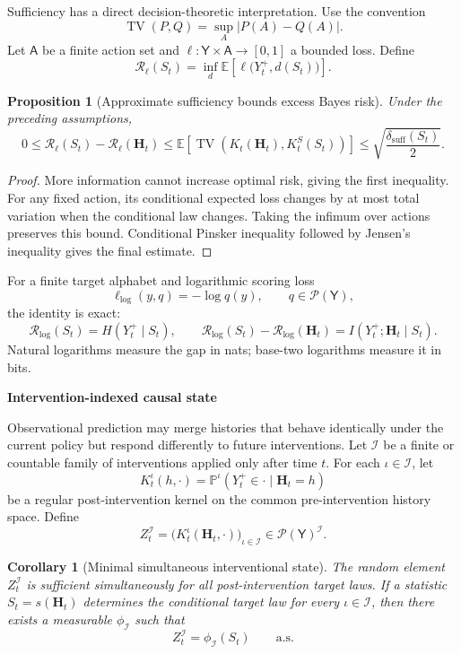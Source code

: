 \documentclass[11pt,letterpaper]{article}
\newcommand{\Risk}{\mathcal R}
\DeclareMathOperator{\TV}{TV}
\newcommand{\subtopic}[1]{%
 \vspace{0.45em}
 {\bfseries\color{AccentColor} #1\par}
}
\theoremstyle{plain}
\newtheorem{proposition}[theorem]{Proposition}
\newtheorem{corollary}[theorem]{Corollary}
\theoremstyle{definition}
\begin{document}
Sufficiency has a direct decision-theoretic interpretation. Use the
convention
\[
\TV(P,Q)=\sup_{A}|P(A)-Q(A)|.
\]
Let \(\mathsf A\) be a finite action set and
\(\ell:\mathsf Y\times\mathsf A\to[0,1]\) a bounded loss. Define
\[
\Risk_\ell(S_t)
=
\inf_{d}
\mathbb E\!\left[
\ell\bigl(Y_t^+,d(S_t)\bigr)
\right].
\]

\begin{proposition}[Approximate sufficiency bounds excess Bayes risk]
\label{prop:risk-pinsker}
Under the preceding assumptions,
\[
\boxed{
0
\leq
\Risk_\ell(S_t)-\Risk_\ell(\mathbf H_t)
\leq
\mathbb E\!\left[
\TV\!\left(K_t(\mathbf H_t),K_t^S(S_t)\right)
\right]
\leq
\sqrt{\frac{\delta_{\mathrm{suff}}(S_t)}{2}}.
}
\]
\end{proposition}

\begin{proof}
More information cannot increase optimal risk, giving the first inequality.
For any fixed action, its conditional expected loss changes by at most total
variation when the conditional law changes. Taking the infimum over actions
preserves this bound. Conditional Pinsker inequality followed by Jensen's
inequality gives the final estimate.
\end{proof}

For a finite target alphabet and logarithmic scoring loss
\[
\ell_{\log}(y,q)=-\log q(y),
\qquad
q\in\mathcal P(\mathsf Y),
\]
the identity is exact:
\[
\boxed{
\Risk_{\log}(S_t)=H(Y_t^+\mid S_t),
\qquad
\Risk_{\log}(S_t)-\Risk_{\log}(\mathbf H_t)
=
I(Y_t^+;\mathbf H_t\mid S_t).
}
\]
Natural logarithms measure the gap in nats; base-two logarithms measure it in
bits.

\subtopic{Intervention-indexed causal state}

Observational prediction may merge histories that behave identically under the
current policy but respond differently to future interventions. Let
\(\mathcal I\) be a finite or countable family of interventions applied only
after time \(t\). For each \(\iota\in\mathcal I\), let
\[
K_t^{\iota}(h,\cdot)
=
\mathbb P^{\iota}(Y_t^+\in\cdot\mid\mathbf H_t=h)
\]
be a regular post-intervention kernel on the common pre-intervention history
space. Define
\[
\boxed{
Z_t^{\mathcal I}
=
\bigl(K_t^{\iota}(\mathbf H_t,\cdot)\bigr)_{\iota\in\mathcal I}
\in
\mathcal P(\mathsf Y)^{\mathcal I}.
}
\]

\begin{corollary}[Minimal simultaneous interventional state]
\label{cor:interventional-state}
The random element \(Z_t^{\mathcal I}\) is sufficient simultaneously for all
post-intervention target laws. If a statistic \(S_t=s(\mathbf H_t)\)
determines the conditional target law for every \(\iota\in\mathcal I\), then
there exists a measurable \(\phi_{\mathcal I}\) such that
\[
Z_t^{\mathcal I}=\phi_{\mathcal I}(S_t)
\qquad\text{a.s.}
\]
\end{corollary}
\end{document}
